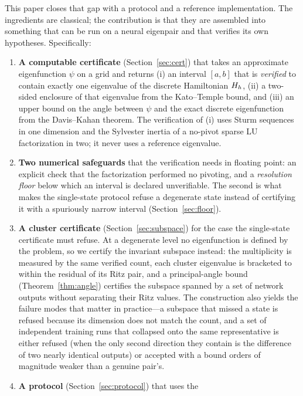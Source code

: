 This paper closes that gap with a protocol and a reference implementation. The
ingredients are classical; the contribution is that they are assembled into
something that can be run on a neural eigenpair and that verifies its own
hypotheses. Specifically:

\begin{enumerate}
\item \textbf{A computable certificate} (Section~\ref{sec:cert}) that takes an
  approximate eigenfunction $\psi$ on a grid and returns
  (i) an interval $[a,b]$ that is \emph{verified} to contain exactly one
  eigenvalue of the discrete Hamiltonian $H_h$,
  (ii) a two-sided enclosure of that eigenvalue from the Kato--Temple bound,
  and (iii) an upper bound on the angle between $\psi$ and the exact discrete
  eigenfunction from the Davis--Kahan theorem. The verification of (i) uses
  Sturm sequences in one dimension and the Sylvester inertia of a no-pivot
  sparse LU factorization in two; it never uses a reference eigenvalue.
\item \textbf{Two numerical safeguards} that the verification needs in
  floating point: an explicit check that the factorization performed no
  pivoting, and a \emph{resolution floor} below which an interval is declared
  unverifiable. The second is what makes the single-state protocol refuse a
  degenerate state instead of certifying it with a spuriously narrow interval
  (Section~\ref{sec:floor}).
\item \textbf{A cluster certificate} (Section~\ref{sec:subspace}) for the case
  the single-state certificate must refuse. At a degenerate level no
  eigenfunction is defined by the problem, so we certify the invariant
  subspace instead: the multiplicity is measured by the same verified count,
  each cluster eigenvalue is bracketed to within the residual of its Ritz
  pair, and a principal-angle bound (Theorem~\ref{thm:angle}) certifies the
  subspace spanned by a set of network outputs without separating their Ritz
  values. The construction also yields the failure modes that matter in
  practice---a subspace that missed a state is refused because its dimension
  does not match the count, and a set of independent training runs that
  collapsed onto the same representative is either refused (when the only
  second direction they contain is the difference of two nearly identical
  outputs) or accepted with a bound orders of magnitude weaker than a genuine
  pair's.
\item \textbf{A protocol} (Section~\ref{sec:protocol}) that uses the

\end{enumerate}
